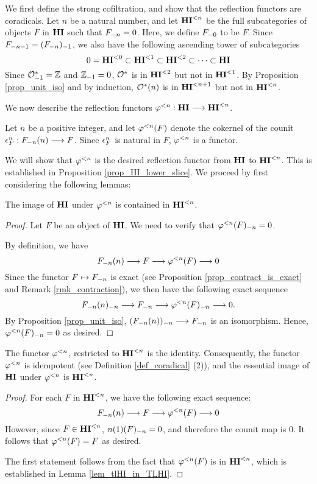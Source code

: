 We first define the strong cofiltration, and show that the 
reflection functors are coradicals. Let $n$ be a natural number, 
and let $\TLHI{n}{\HI}$ be the full subcategories of objects $F$ 
in $\HI$ such that $\RHI[n]{F} = 0$. Here, we define $\RHI[0]{F}$
to be $F$. Since $\RHI[n - 1]{F} = \RHI{(\RHI[n]{F})}$, we also 
have the following ascending tower of subcategories
\[
0 = \TLHI{0}{\HI} \subset \TLHI{1}{\HI} \subset \TLHI{2}{\HI} 
   \subset \cdots \subset \HI
\]
Since $\RHI{\Ox} = \Z$ and $\RHI{\Z} = 0$, $\Ox$ is in 
$\TLHI{2}{\HI}$ but not in $\TLHI{1}{\HI}$. By Proposition 
\ref{prop_unit_iso} and by induction, $\LHI[n]{\Ox}$ is in 
$\TLHI{n + 1}{\HI}$ but not in $\TLHI{n}{\HI}$.

We now describe the reflection functors $\tlHI{n} : \HI \to 
\TLHI{n}{\HI}$. 

\begin{defn}
Let $n$ be a positive integer, and let $\tlHI{n}(F)$ denote the 
cokernel of the counit $\cuHI^n_F: \LHI[n]{\RHI[n]{F}} \to F$. 
Since $\cuHI^n_F$ is natural in $F$, $\tlHI{n}$ is a functor.
\end{defn}

We will show that $\tlHI{n}$ is the desired reflection functor
from $\HI$ to $\TFHI{n}$. This is established in Proposition
\ref{prop_HI_lower_slice}. We proceed by first considering the
following lemmas:

\begin{lem}\label{lem_tlHI_in_TLHI}
The image of $\HI$ under $\tlHI{n}$ is contained in 
$\TLHI{n}{\HI}$.
\end{lem}

\begin{proof}
Let $F$ be an object of $\HI$. We need to verify that 
$\RHI[n]{\tlHI{n}(F)} = 0$.

By definition, we have
\[
\LHI[n]{\RHI[n]{F}} \to F \to \tlHI{n}(F) \to 0
\]
Since the functor $F \mapsto \RHI[n]{F}$ is exact (see Proposition
\ref{prop_contract_is_exact} and Remark \ref{rmk_contraction}), we 
then have the following exact sequence
\[
\RHI[n]{\LHI[n]{\RHI[n]{F}}} \to \RHI[n]{F} \to
\RHI[n]{\tlHI{n}(F)} \to 0.
\]
By Proposition \ref{prop_unit_iso}, $\RHI[n]{(\LHI[n]{\RHI[n]{F}})}
\to \RHI[n]{F}$ is an isomorphism. Hence,
$\RHI[n]{\tlHI{n}(F)} = 0$ as desired.
\end{proof}

\begin{lem}\label{lem_tlHI_id}
The functor $\tlHI{n}$, restricted to $\TFHI{n}$ is the 
identity. Consequently, the functor $\tlHI{n}$ is idempotent
(see Definition \ref{def_coradical} (2)), and the essential
image of $\HI$ under $\tlHI{n}$ is $\TFHI{n}$.
\end{lem}
\begin{proof}
For each $F$ in $\TFHI{n}$, we have the following exact sequence:
\[
\LHI[n]{\RHI[n]{F}} \to F \to \tlHI{n}(F) \to 0
\]
However, since $F \in \TFHI{n}$, $\RHI[n]{\LHI{n}(F)} = 0$, 
and therefore the counit map is $0$. It follows that $\tlHI{n}(F) = F$ 
as desired.

The first statement follows from the fact that $\tlHI{n}(F)$ is in
$\TLHI{n}{\HI}$, which is established in Lemma \ref{lem_tlHI_in_TLHI}.
\end{proof}

